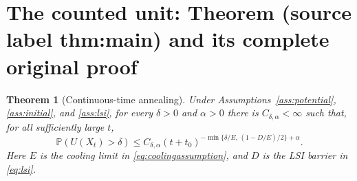 \documentclass[10pt,a4paper]{amsart}
\theoremstyle{plain}
\newtheorem{theorem}{Theorem}[section]
\theoremstyle{definition}
\begin{document}
\section{The counted unit: Theorem (source label thm:main) and its complete original proof}

\begin{theorem}[Continuous-time annealing]\label{thm:main}
Under Assumptions~\ref{ass:potential}, \ref{ass:initial}, and \ref{ass:lsi}, for every
$\delta>0$ and $\alpha>0$ there is $C_{\delta,\alpha}<\infty$ such that, for
all sufficiently large $t$,
\begin{equation}\label{eq:mainrate}
 \mathbb P\left(U(X_t)>\delta\right)
 \leq C_{\delta,\alpha}(t+t_0)^{-\min\{\delta/E,\,(1-D/E)/2\}+\alpha}.
\end{equation}
Here $E$ is the cooling limit in \eqref{eq:coolingassumption}, and $D$ is the
LSI barrier in \eqref{eq:lsi}.
\end{theorem}
\end{document}
